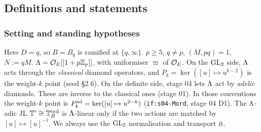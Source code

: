 \subsection{Definitions and statements}

\subsubsection{Setting and standing hypotheses}\label{ss:s06-setting}
Here $D=q$, so $B=B_q$ is ramified at $\{q,\infty\}$. $p\ge5$, $q\ne p$, $(M,pq)=1$, $N:=qM$. $\Lambda=\mathcal{O}_E[[1+p\mathbb{Z}_p]]$, with
uniformiser $\varpi$ of $\mathcal{O}_E$. On the $\mathrm{GL}_2$ side, $\Lambda$ acts through the \emph{classical} diamond operators, and
$P_k=\ker([u]\mapsto u^{k-2})$ is the weight-$k$ point (seed \S2.6). On the definite side, stage 04 lets $\Lambda$ act by
\emph{adelic} diamonds. These are inverse to the classical ones (stage 01). In those conventions the weight-$k$ point is
$P^{\rm ad}_k=\ker([u]\mapsto u^{2-k})$ (\texttt{if:s04-Mord}, stage 04 D1). The $\Lambda$-adic JL $\mathbb{T}'\cong\mathbb{T}^{\mathrm{ord}}_B$ is
$\Lambda$-linear only if the two actions are matched by $[u]\mapsto[u]^{-1}$. We always use the $\mathrm{GL}_2$ normalisation and transport it.

